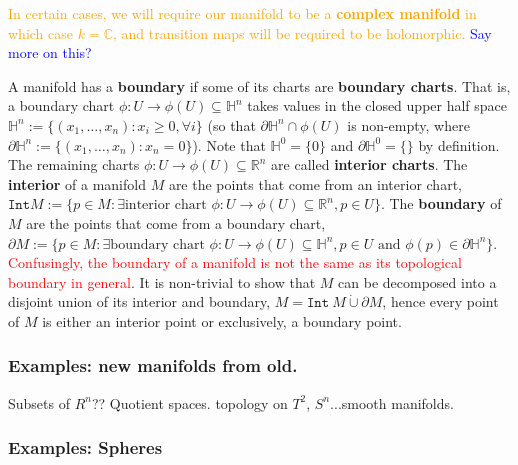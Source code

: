 \documentclass[a4paper]{article}
\theoremstyle{definition} \newtheorem*{definition}{Definition}
\theoremstyle{definition} \newtheorem*{definitions}{Definitions}
\theoremstyle{plain} \newtheorem{theorem}{Theorem}[section]
\theoremstyle{plain} \newtheorem{proposition}[theorem]{Proposition}
\theoremstyle{plain} \newtheorem{corollary}[theorem]{Corollary}
\theoremstyle{plain} \newtheorem{lemma}[theorem]{Lemma}
\theoremstyle{plain} \newtheorem{example}[theorem]{Example}
\newcommand{\checkCorrect}[1]{\textcolor{red}{#1}}
\newcommand{\understandBetter}[1]{\textcolor{orange}{#1}}
\newcommand{\explainFurther}[1]{\textcolor{blue}{#1}}
\newcommand{\defn}[1]{\textbf{#1}}
\newcommand{\realnos}{\mathbb{R}}
\newcommand{\complexnos}{\mathbb{C}}
\begin{document}
\understandBetter{In certain cases, we will require our manifold to be a \defn{complex manifold} in which case $k=\complexnos$, and transition maps will be required to be \understandBetter{holomorphic}.}
\explainFurther{Say more on this?}

A manifold has a \defn{boundary} if some of its charts are \defn{boundary charts}. That is, a boundary chart $\phi:U\to \phi(U)\subseteq \mathbb{H}^n$ takes values in the closed upper half space $\mathbb{H}^n := \{(x_1, \ldots, x_n): x_i\geq 0, \forall i\}$ (so that $\partial \mathbb{H}^n \cap \phi(U)$ is non-empty, where $\partial \mathbb{H}^n := \{(x_1, \ldots, x_n): x_n=0\}$). Note that $\mathbb{H}^0 = \{0\}$ and $\partial \mathbb{H}^0 = \{\}$ by definition. The remaining charts $\phi:U\to \phi(U)\subseteq \realnos^n$ are called \defn{interior charts}. The \defn{interior} of a manifold $M$ are the points that come from an interior chart, $\texttt{Int} M := \{p\in M: \exists \textrm{interior chart } \phi:U\to \phi(U)\subseteq \realnos^n, p\in U \}$. The \defn{boundary} of $M$ are the points that come from a boundary chart, $\partial M:=\{p\in M: \exists \textrm{boundary chart } \phi:U\to \phi(U)\subseteq \mathbb{H}^n, p\in U \textrm{ and } \phi(p)\in \partial \mathbb{H}^n \}$. \checkCorrect{Confusingly, the boundary of a manifold is not the same as its topological boundary in general}. It is non-trivial to show that $M$ can be decomposed into a disjoint union of its interior and boundary, $M = \mathtt{Int} \ M \mathbin{\dot{\cup}} \partial M$, hence every point of $M$ is either an interior point or exclusively, a boundary point.

\subsubsection{Examples: new manifolds from old.}

Subsets of $R^n$?? Quotient spaces.
topology on $T^2$, $S^n$...smooth manifolds.

\subsubsection{Examples: Spheres}
\end{document}
